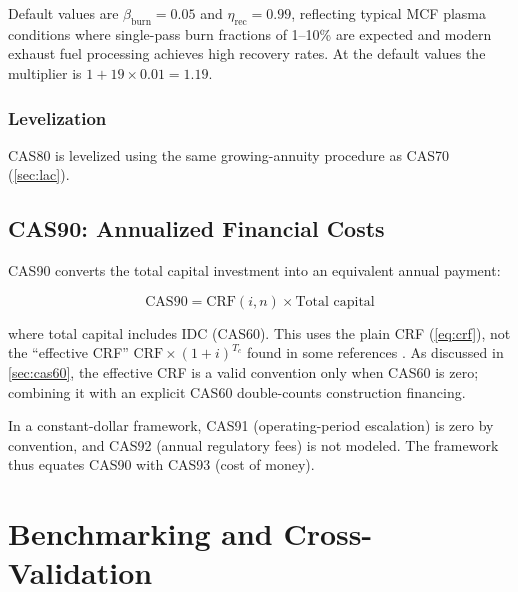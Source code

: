 \documentclass{article}
\begin{document}
Default values are $\beta_{\text{burn}} = 0.05$ and
$\eta_{\text{rec}} = 0.99$, reflecting typical MCF plasma
conditions where single-pass burn fractions of 1--10\% are
expected and modern exhaust fuel processing achieves high
recovery rates. At the default values the multiplier is
$1 + 19 \times 0.01 = 1.19$.

\subsubsection{Levelization}
CAS80 is levelized using the same growing-annuity procedure as
CAS70 (\cref{sec:lac}).


\subsection{CAS90: Annualized Financial Costs}
\label{sec:cas90}

CAS90 converts the total capital investment into an equivalent annual
payment:

\begin{equation}
\label{eq:cas90}
\text{CAS90} = \text{CRF}(i, n) \times \text{Total capital}
\end{equation}

\noindent where total capital includes IDC (CAS60). This uses the
plain CRF (\cref{eq:crf}), not the ``effective CRF''
$\text{CRF} \times (1+i)^{T_c}$ found in some references
\citep{miller1998}. As discussed in \cref{sec:cas60}, the effective
CRF is a valid convention only when CAS60 is zero; combining it with
an explicit CAS60 double-counts construction financing.

In a constant-dollar framework, CAS91 (operating-period escalation)
is zero by convention, and CAS92 (annual regulatory fees) is not
modeled. The framework thus equates CAS90 with CAS93 (cost of money).


\section{Benchmarking and Cross-Validation}
\label{sec:benchmark}
\end{document}

